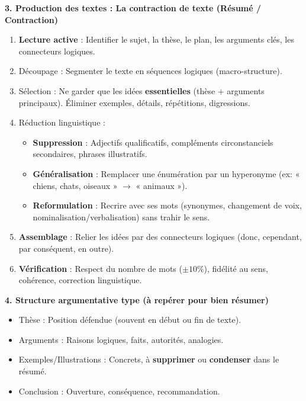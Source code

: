 \documentclass[11pt]{article}
\newcommand{\cle}[1]{{\popxbold\color{popdark}#1}}
\begin{document}
\begin{bilan}
\textbf{3. Production des textes : La contraction de texte (Résumé / Contraction)}
\begin{methode}
\begin{enumerate}
    \item \textbf{Lecture active} : Identifier le sujet, la thèse, le plan, les arguments clés, les connecteurs logiques.
    \item \cle{Découpage} : Segmenter le texte en séquences logiques (macro-structure).
    \item \cle{Sélection} : Ne garder que les idées \textbf{essentielles} (thèse + arguments principaux). Éliminer exemples, détails, répétitions, digressions.
    \item \cle{Réduction linguistique} :
        \begin{itemize}
            \item \textbf{Suppression} : Adjectifs qualificatifs, compléments circonstanciels secondaires, phrases illustratifs.
            \item \textbf{Généralisation} : Remplacer une énumération par un hyperonyme (ex: « chiens, chats, oiseaux » $\rightarrow$ « animaux »).
            \item \textbf{Reformulation} : Recrire avec ses mots (synonymes, changement de voix, nominalisation/verbalisation) sans trahir le sens.
        \end{itemize}
    \item \textbf{Assemblage} : Relier les idées par des connecteurs logiques (donc, cependant, par conséquent, en outre).
    \item \textbf{Vérification} : Respect du nombre de mots ($\pm 10\%$), fidélité au sens, cohérence, correction linguistique.
\end{enumerate}
\end{methode}

\textbf{4. Structure argumentative type (à repérer pour bien résumer)}
\begin{itemize}
    \item \cle{Thèse} : Position défendue (souvent en début ou fin de texte).
    \item \cle{Arguments} : Raisons logiques, faits, autorités, analogies.
    \item \cle{Exemples/Illustrations} : Concrets, à \textbf{supprimer} ou \textbf{condenser} dans le résumé.
    \item \cle{Conclusion} : Ouverture, conséquence, recommandation.
\end{itemize}

\end{bilan}
\end{document}
